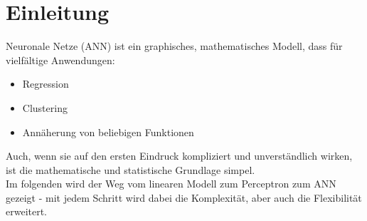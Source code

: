 
\section{Einleitung}
Neuronale Netze (ANN) ist ein graphisches, mathematisches Modell, dass für vielfältige Anwendungen:

\begin{itemize}
\item Regression
\item Clustering
\item Annäherung von beliebigen Funktionen
\end{itemize}

Auch, wenn sie auf den ersten Eindruck kompliziert und unverständlich wirken, ist die mathematische und statistische Grundlage simpel.\\
Im folgenden wird der Weg vom linearen Modell zum Perceptron zum ANN gezeigt - mit jedem Schritt wird dabei die Komplexität, aber auch die Flexibilität erweitert.